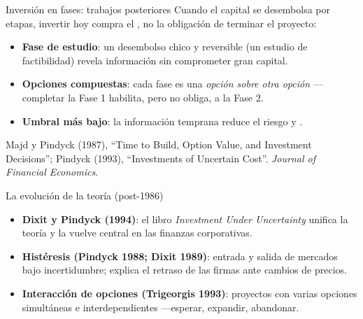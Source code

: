 \begin{frame}{Inversión en fases: trabajos posteriores}
  Cuando el capital se desembolsa por etapas, invertir hoy compra el
  , no la obligación de terminar el proyecto:
  \begin{itemize}
    \item \textbf{Fase de estudio}: un desembolso chico y reversible (un
          estudio de factibilidad) revela información sin comprometer gran
          capital.
    \item \textbf{Opciones compuestas}: cada fase es una \emph{opción sobre
          otra opción} --- completar la Fase 1 habilita, pero no obliga, a la
          Fase 2.
    \item \textbf{Umbral más bajo}: la información temprana reduce el riesgo y
           .
  \end{itemize}
  \par\vspace{2mm}
  {\fontsize{8}{10}\selectfont Majd y Pindyck (1987), ``Time to Build, Option
   Value, and Investment Decisions''; Pindyck (1993), ``Investments of
   Uncertain Cost''. \emph{Journal of Financial Economics}.\par}
\end{frame}

\begin{frame}{La evolución de la teoría (post-1986)}
  \begin{itemize}
    \item \textbf{Dixit y Pindyck (1994)}: el libro \emph{Investment Under
          Uncertainty} unifica la teoría y la vuelve central en las finanzas
          corporativas.
    \item \textbf{Histéresis (Pindyck 1988; Dixit 1989)}: entrada y salida de
          mercados bajo incertidumbre; explica el retraso de las firmas ante
          cambios de precios.
    \item \textbf{Interacción de opciones (Trigeorgis 1993)}: proyectos con
          varias opciones simultáneas e interdependientes ---esperar, expandir,
          abandonar.
  \end{itemize}
\end{frame}
